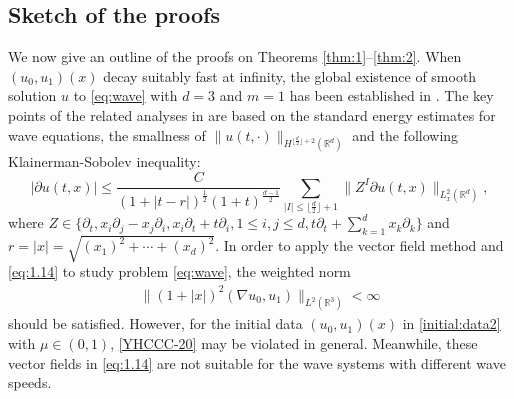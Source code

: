 \documentclass[11pt,twoside]{article}
\theoremstyle{plain}
\theoremstyle{definition}
\numberwithin{equation}{section}
\begin{document}
\subsection{Sketch of the proofs}

We now give an outline of the proofs on Theorems \ref{thm:1}--\ref{thm:2}. When
$(u_0,u_1)(x)$ decay suitably fast at infinity, the global existence of smooth solution $u$ to \eqref{eq:wave} with $d = 3$ and $m=1$ has been established in \cite{Klainerman3}. The key points of the related analyses in \cite{Klainerman3} are based on the standard energy estimates for wave
equations, the smallness of $\|u(t,\cdot)\|_{H^{\lfloor \frac{d}{2} \rfloor+2}(\mathbb{R}^d)}$ and the following Klainerman-Sobolev inequality:
\begin{equation}\label{eq:1.14}
|\partial u(t,x)| \leq \frac{C}{(1+|t-r|)^{\frac{1}{2}}(1+t)^{\frac{d-1}{2}}}
\sum_{|I| \leq \lfloor \frac{d}{2} \rfloor+1} \|Z^I \partial u(t,x)\|_{L_x^2(\mathbb{R}^d)},
\end{equation}
where $Z \in \{\partial_t,x_i\partial_j - x_j\partial_i,x_i\partial_t + t\partial_i,1 \leq i,j \leq d,t\partial_t + \sum\limits_{k=1}^d x_k\partial_k\}$ and
$r = |x| = \sqrt{(x_1)^2+\cdots+(x_d)^2}$.
In order to apply the vector field method and \eqref{eq:1.14} to study problem \eqref{eq:wave}, the weighted norm
\begin{equation}\label{YHCCC-20}
\begin{split}
\|(1+|x|)^2(\nabla u_0,u_1)\|_{L^2(\mathbb{R}^3)}<\infty
\end{split}
\end{equation}
should be satisfied. However, for the initial data $(u_0,u_1)(x)$ in \eqref{initial:data2} with $\mu\in (0,1)$,
\eqref{YHCCC-20} may be violated in general. Meanwhile,
these  vector fields in \eqref{eq:1.14} are not suitable for the wave systems with different wave speeds.
\end{document}
